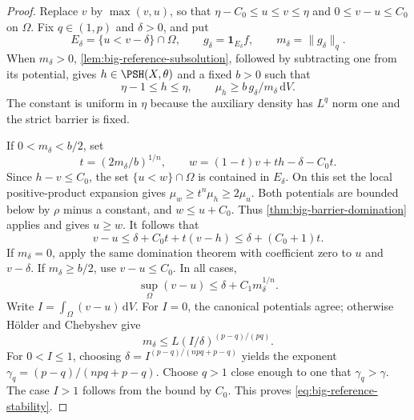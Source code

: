 \begin{proof}
Replace $v$ by $\max(v,u)$, so that
$\eta-C_0\leq u\leq v\leq\eta$ and $0\leq v-u\leq C_0$ on $\Omega$.
Fix $q\in(1,p)$ and $\delta>0$, and put
\[
 E_\delta=\{u<v-\delta\}\cap\Omega,\qquad
 g_\delta=\mathbf1_{E_\delta}f,\qquad m_\delta=\|g_\delta\|_q.
\]
When $m_\delta>0$, \cref{lem:big-reference-subsolution}, followed by
subtracting one from its potential, gives $h\in\PSH(X,\theta)$ and a
fixed $b>0$ such that
\[
 \eta-1\leq h\leq\eta,\qquad
 \mu_h\geq b\,g_\delta/m_\delta\,\mathrm{d}V.
\]
The constant is uniform in $\eta$ because the auxiliary density has
$L^q$ norm one and the strict barrier is fixed.

If $0<m_\delta<b/2$, set
\[
 t=(2m_\delta/b)^{1/n},\qquad
 w=(1-t)v+th-\delta-C_0t.
\]
Since $h-v\leq C_0$, the set $\{u<w\}\cap\Omega$ is contained in
$E_\delta$. On this set the local positive-product expansion gives
$\mu_w\geq t^n\mu_h\geq2\mu_u$. Both potentials are bounded below
by $\rho$ minus a constant, and $w\leq u+C_0$. Thus
\cref{thm:big-barrier-domination} applies and gives $u\geq w$. It follows
that
\[
 v-u\leq\delta+C_0t+t(v-h)\leq\delta+(C_0+1)t.
\]
If $m_\delta=0$, apply the same domination theorem with coefficient zero
to $u$ and $v-\delta$. If $m_\delta\geq b/2$, use $v-u\leq C_0$.
In all cases,
\[
 \sup_\Omega(v-u)\leq\delta+C_1m_\delta^{1/n}.
\]
Write $I=\int_\Omega(v-u)\,\mathrm{d}V$. For $I=0$, the canonical
potentials agree; otherwise H\"older and Chebyshev give
\[
 m_\delta\leq L(I/\delta)^{(p-q)/(pq)}.
\]
For $0<I\leq1$, choosing
$\delta=I^{(p-q)/(npq+p-q)}$ yields the exponent
$\gamma_q=(p-q)/(npq+p-q)$. Choose $q>1$ close enough to one that
$\gamma_q>\gamma$. The case $I>1$ follows from the bound by $C_0$.
This proves \eqref{eq:big-reference-stability}.
\end{proof}

